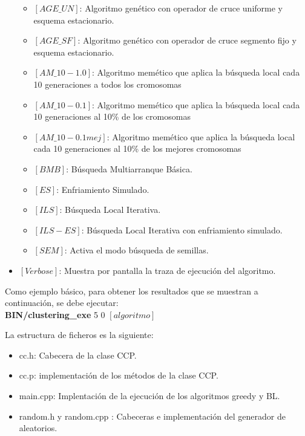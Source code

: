 \begin{itemize}
\begin{itemize}
      \item $[AGE\_UN]$: Algoritmo genético con operador de cruce uniforme y esquema estacionario.
      \item $[AGE\_SF]$: Algoritmo genético con operador de cruce segmento fijo y esquema estacionario.
      \item $[AM\_10-1.0]$: Algoritmo memético que aplica la búsqueda local cada 10 generaciones a todos los cromosomas
      \item $[AM\_10-0.1]$: Algoritmo memético que aplica la búsqueda local cada 10 generaciones al 10\% de los cromosomas
      \item $[AM\_10-0.1mej]$: Algoritmo memético que aplica la búsqueda local cada 10 generaciones al 10\% de los mejores cromosomas
      \item $[BMB]$: Búsqueda Multiarranque Básica.
      \item $[ES]$: Enfriamiento Simulado.
      \item $[ILS]$: Búsqueda Local Iterativa.
      \item $[ILS-ES]$: Búsqueda Local Iterativa con enfriamiento simulado.
      \item $[SEM]$: Activa el modo búsqueda de semillas.
   \end{itemize}
   \item $[Verbose]$: Muestra por pantalla la traza de ejecución del algoritmo.
\end{itemize}

Como ejemplo básico, para obtener los resultados que se muestran a continuación, se debe ejecutar:\\ \textbf{BIN/clustering\_exe} 5 0 $[algoritmo]$

La estructura de ficheros es la siguiente:
\begin{itemize}
   \item cc.h: Cabecera de la clase CCP.
   \item cc.p: implementación de los métodos de la clase CCP.
   \item main.cpp: Implentación de la ejecución de los algoritmos greedy y BL.
   \item random.h y random.cpp : Cabeceras e implementación del generador de aleatorios.
\end{itemize}
